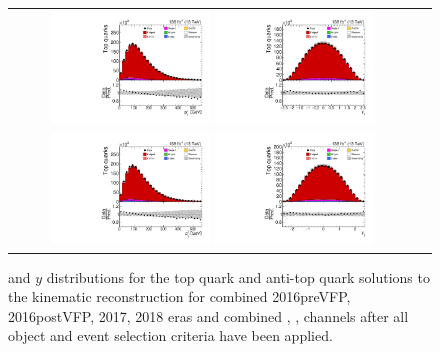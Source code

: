 \begin{figure}[htb]
    \begin{center}
        \begin{tabular}{cc}
            \includegraphics[width=0.40\textwidth]{fig_fullRun2UL/controlplots/combined/HypToppT.pdf}
            \includegraphics[width=0.40\textwidth]{fig_fullRun2UL/controlplots/combined/HypTopRapidity.pdf} \\
            \includegraphics[width=0.40\textwidth]{fig_fullRun2UL/controlplots/combined/HypAntiToppT.pdf}
            \includegraphics[width=0.40\textwidth]{fig_fullRun2UL/controlplots/combined/HypAntiTopRapidity.pdf} 
        \end{tabular}
        \caption{\footnotesize \pT and $y$ distributions for the top quark and anti-top quark solutions to the kinematic reconstruction for combined 2016preVFP, 2016postVFP, 2017, 2018 eras and combined \ee, \emu, \mumu channels after all object and event selection criteria have been applied.
}
\end{center}
\end{figure}
